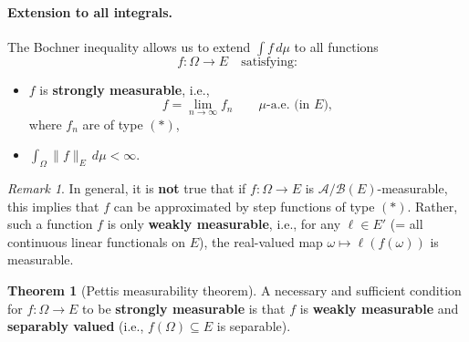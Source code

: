 \documentclass[11pt]{article}
\theoremstyle{definition}
\newtheorem{theorem}{Theorem}
\theoremstyle{remark}
\newtheorem{remark}{Remark}
\begin{document}
\paragraph{Extension to all integrals.}

The Bochner inequality allows us to extend $\int f\,d\mu$ to all functions
\[
    f \colon \Omega \to E
    \quad \text{satisfying:}
\]
\begin{itemize}
    \item $f$ is \textbf{strongly measurable}, i.e.,
          \[
              f = \lim_{n \to \infty} f_n
              \qquad \mu\text{-a.e.\ (in $E$)},
          \]
          where $f_n$ are of type $(*)$,

    \item $\displaystyle\int_\Omega \|f\|_E\,d\mu < \infty$.
\end{itemize}

\begin{remark}
In general, it is \textbf{not} true that if
$f \colon \Omega \to E$ is $\mathcal{A}/\mathcal{B}(E)$-measurable,
this implies that $f$ can be approximated by step functions of type $(*)$.
Rather, such a function $f$ is only \textbf{weakly measurable}, i.e.,
for any $\ell \in E'$ (= all continuous linear functionals on $E$),
the real-valued map $\omega \mapsto \ell(f(\omega))$ is measurable.
\end{remark}

\begin{theorem}[Pettis measurability theorem]
A necessary and sufficient condition for
$f \colon \Omega \to E$ to be \textbf{strongly measurable} is that $f$ is
\textbf{weakly measurable} and \textbf{separably valued}
(i.e., $f(\Omega) \subseteq E$ is separable).
\end{theorem}
\end{document}
